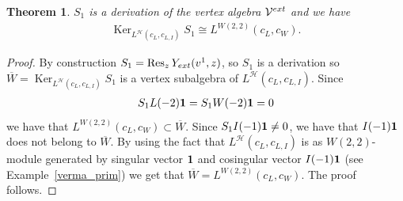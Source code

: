 \documentclass[11pt]{article}
\numberwithin{equation}{section}
\newtheorem{Theorem}{Theorem}[section]
\newcommand{\HVir}{\mathcal H}
\DeclareMathOperator{\Ker}{Ker}
\begin{document}
\begin{Theorem}
$S_1$ is a derivation of the vertex algebra $\mathcal V^{\rm ext}$ and we have
\begin{gather*}
\Ker_{ L^{\HVir} (c_L,c_{L,I}) } S_1 \cong L ^{W(2,2)} (c_L, c_W ).
\end{gather*}
\end{Theorem}
\begin{proof}
By construction $S_1 = \operatorname{Res}_z Y_{\rm ext} (v^1, z)$, so $S_1$ is a derivation so $\overline W = \Ker_{ L^{\HVir} (c_L,c_{L,I}) } S_1$ is a vertex subalgebra of $L^{\HVir} (c_L,c_{L,I})$. Since
\begin{gather*}
S_1 L(-2) {\bf 1} = S_1 W(-2) {\bf 1} = 0
\end{gather*}
we have that $L ^{W(2,2)} (c_L, c_W ) \subset \overline W$. Since $S_1 I (-1) {\bf 1} \ne 0$, we have that $I(-1) {\bf 1}$ does not belong to $\overline W$. By using the fact that $L^{\HVir} (c_L,c_{L,I})$ is as $W(2,2)$-module generated by singular vector $\bf{1}$ and cosingular vector $I(-1) {\bf 1}$ (see Example~\ref{verma_prim}) we get that $\overline W = L ^{W(2,2)} (c_L, c_W )$. The proof follows.
\end{proof}
\end{document}
